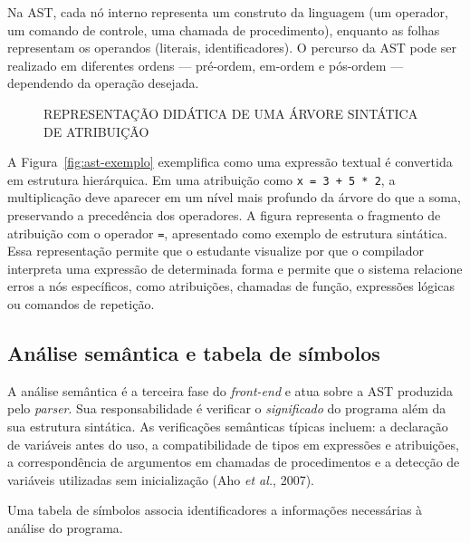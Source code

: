 \documentclass[
    12pt
    ,oneside
    ,a4paper
    ,chapter=TITLE
    ,section=TITLE
    ,sumario=abnt-6027-2012]{abntex2}
\newcommand{\citeAho}{(Aho \textit{et al.}, 2007)}
\renewcommand{\legenda}[2][]{%
    \centering
    \caption[\MakeTextUppercase{#2}]{\maybeLabel{#1}\MakeTextUppercase{#2}}%
}
\begin{document}
Na AST, cada nó interno representa um construto da linguagem (um operador, um comando de
controle, uma chamada de procedimento), enquanto as folhas representam os operandos (literais,
identificadores). O percurso da AST pode ser realizado em diferentes
ordens — pré-ordem, em-ordem e pós-ordem — dependendo da operação desejada.

\begin{figure}[htb]
\centering
\legenda[fig:ast-exemplo]{Representação didática de uma árvore sintática de atribuição}

\end{figure}

A Figura~\ref{fig:ast-exemplo} exemplifica como uma expressão textual é convertida em
estrutura hierárquica. Em uma atribuição como \texttt{x = 3 + 5 * 2}, a multiplicação deve
aparecer em um nível mais profundo da árvore do que a soma, preservando a precedência dos
operadores. A figura representa o fragmento de atribuição com o operador \texttt{=},
apresentado como exemplo de estrutura sintática. Essa representação permite que o estudante visualize por que o compilador interpreta
uma expressão de determinada forma e permite que o sistema relacione erros a nós específicos,
como atribuições, chamadas de função, expressões lógicas ou comandos de repetição.

\subsection{Análise semântica e tabela de símbolos}

A análise semântica é a terceira fase do \textit{front-end} e atua sobre a AST produzida pelo
\textit{parser}. Sua responsabilidade é verificar o \textit{significado} do programa além da
sua estrutura sintática. As verificações semânticas típicas incluem: a declaração de variáveis
antes do uso, a compatibilidade de tipos em expressões e atribuições, a correspondência de
argumentos em chamadas de procedimentos e a detecção de variáveis utilizadas sem inicialização
\citeAho.

Uma tabela de símbolos associa identificadores a informações necessárias à análise do
programa.

\end{document}
